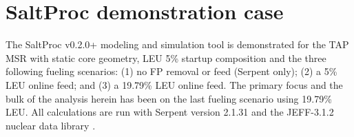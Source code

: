 \documentclass[12pt]{article} %
\begin{document}
\section{SaltProc demonstration case}
The SaltProc v0.2.0+ modeling and simulation tool is demonstrated for the 
\gls{TAP} \gls{MSR} with static core geometry, \gls{LEU} 5\% startup 
composition  \cite{transatomic_power_corporation_neutronics_2016} and the 
three following fueling scenarios: (1) no \gls{FP} removal or feed (Serpent 
only); (2) a 5\% \gls{LEU} online feed; and (3) a 19.79\% \gls{LEU} online 
feed. The primary focus and the bulk of the analysis herein has been on the 
last fueling scenario using 19.79\% \gls{LEU}. All calculations are run with 
Serpent version 2.1.31 and the JEFF-3.1.2 nuclear data library 
\cite{leppanen_serpent_2013, oecd/nea_data_bank_jeff-3.1.2_2014}.
\end{document}
